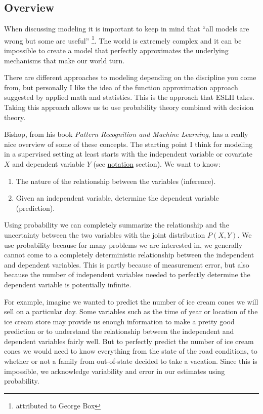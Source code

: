 \subsection{Overview}

When discussing modeling it is important to keep in mind that ``all models are wrong but some are useful'' \footnote{attributed to George Box}. The world is extremely complex and it can be impossible to create a model that perfectly approximates the underlying mechanisms that make our world turn.

There are different approaches to modeling depending on the discipline you come from, but personally I like the idea of the function approximation approach suggested by applied math and statistics. This is the approach that ESLII takes. Taking this approach allows us to use probability theory combined with decision theory.

Bishop, from his book \emph{Pattern Recognition and Machine Learning}, has a really nice overview of some of these concepts. The starting point I think for modeling in a supervised setting at least starts with the independent variable or covariate $X$ and dependent variable $Y$ (see \hyperref[sec:notation]{notation} section). We want to know:

\begin{enumerate}
\item The nature of the relationship between the variables (inference). 
\item Given an independent variable, determine the dependent variable (prediction).
\end{enumerate}

Using probability we can completely summarize the relationship and the uncertainty between the two variables with the joint distribution $P(X,Y)$. We use probability because for many problems we are interested in, we generally cannot come to a completely deterministic relationship between the independent and dependent variables. This is partly because of measurement error, but also because the number of independent variables needed to perfectly determine the dependent variable is potentially infinite. 

For example, imagine we wanted to predict the number of ice cream cones we will sell on a particular day. Some variables such as the time of year or location of the ice cream store may provide us enough information to make a pretty good prediction or to understand the relationship between the independent and dependent variables fairly well. But to perfectly predict the number of ice cream cones we would need to know everything from the state of the road conditions, to whether or not a family from out-of-state decided to take a vacation. Since this is impossible, we acknowledge variability and error in our estimates using probability.

